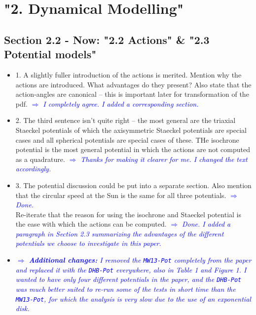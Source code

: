 \documentclass[10pt,a4paper]{article}
\newcommand{\Comment}[1]{\textsl{\textcolor{Blue}{$\Longrightarrow$ {#1}}}}
\begin{document}
\section{"2. Dynamical Modelling"}

\subsection{Section 2.2 - Now: "2.2 Actions" \& "2.3 Potential models"}
\begin{itemize}
\item 1. A slightly fuller introduction of the actions is merited. Mention why the actions are introduced. What advantages do they present? Also state that the action-angles are canonical -- this is important later for transformation of the pdf. \Comment{I completely agree. I added a corresponding section.}
\item 2. The third sentence isn't quite right -- the most general are the triaxial Staeckel potentials of which the axisymmetric Staeckel potentials are special cases and all spherical potentials are special cases of these. THe isochrone potential is the most general potential in which the actions are not computed as a quadrature. \Comment{Thanks for making it clearer for me. I changed the text accordingly.}
\item 3. The potential discussion could be put into a separate section. Also mention that the circular speed at the Sun is the same for all three potentials. \Comment{Done.} \\
Re-iterate that the reason for using the isochrone and Staeckel potential is the ease with which the actions can be computed. \Comment{Done. I added a paragraph in Section 2.3 summarizing the advantages of the different potentials we choose to investigate in this paper.}
\item \Comment{\textbf{Additional changes:} I removed the \texttt{MW13-Pot} completely from the paper and replaced it with the \texttt{DHB-Pot} everywhere, also in Table 1 and Figure 1. I wanted to have only four different potentials in the paper, and the \texttt{DHB-Pot} was much better suited to re-run some of the tests in short time than the \texttt{MW13-Pot}, for which the analysis is very slow due to the use of an exponential disk.}
\end{itemize}
\end{document}
